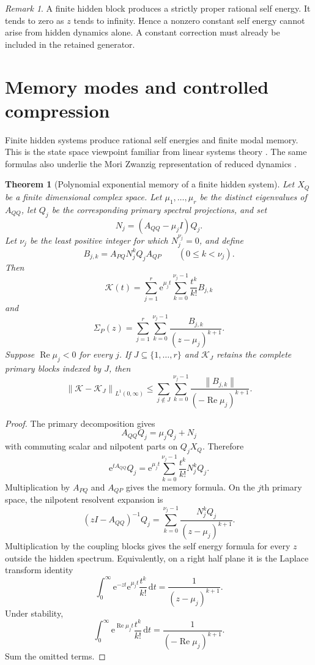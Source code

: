 \documentclass{aomart}
\newtheorem{theorem}{Theorem}[section]
\theoremstyle{definition}
\theoremstyle{remark}
\newtheorem{remark}[remark]{Remark}
\newcommand{\Kcal}{\mathcal K}
\newcommand{\e}{\mathrm e}
\newcommand{\dd}{\,\mathrm d}
\newcommand{\norm}[1]{\left\lVert#1\right\rVert}
\begin{document}
\begin{remark}
A finite hidden block produces a strictly proper rational self energy. It tends to zero as \(z\) tends to infinity. Hence a nonzero constant self energy cannot arise from hidden dynamics alone. A constant correction must already be included in the retained generator.
\end{remark}

\section{Memory modes and controlled compression}\label{sec:memory_compression}

Finite hidden systems produce rational self energies and finite modal memory. This is the state space viewpoint familiar from linear systems theory \cite{Kailath1980}. The same formulas also underlie the Mori Zwanzig representation of reduced dynamics \cite{Zwanzig1961,ChorinHaldKupferman2000}.

\begin{theorem}[Polynomial exponential memory of a finite hidden system]\label{thm:modal_memory}
Let \(X_Q\) be a finite dimensional complex space. Let \(\mu_1,\ldots,\mu_r\) be the distinct eigenvalues of \(A_{QQ}\), let \(Q_j\) be the corresponding primary spectral projections, and set
\[
N_j=(A_{QQ}-\mu_jI)Q_j.
\]
Let \(\nu_j\) be the least positive integer for which \(N_j^{\nu_j}=0\), and define
\[
B_{j,k}
=
A_{PQ}N_j^kQ_jA_{QP}
\qquad
(0\leq k<\nu_j).
\]
Then
\[
\Kcal(t)
=
\sum_{j=1}^r
\e^{\mu_jt}
\sum_{k=0}^{\nu_j-1}
\frac{t^k}{k!}B_{j,k}
\]
and
\[
\Sigma_P(z)
=
\sum_{j=1}^r
\sum_{k=0}^{\nu_j-1}
\frac{B_{j,k}}{(z-\mu_j)^{k+1}}.
\]
Suppose \(\operatorname{Re}\mu_j<0\) for every \(j\). If \(J\subseteq\{1,\ldots,r\}\) and \(\Kcal_J\) retains the complete primary blocks indexed by \(J\), then
\[
\norm{\Kcal-\Kcal_J}_{L^1(0,\infty)}
\leq
\sum_{j\notin J}
\sum_{k=0}^{\nu_j-1}
\frac{\norm{B_{j,k}}}
{(-\operatorname{Re}\mu_j)^{k+1}}.
\]
\end{theorem}

\begin{proof}
The primary decomposition gives
\[
A_{QQ}Q_j=\mu_jQ_j+N_j
\]
with commuting scalar and nilpotent parts on \(Q_jX_Q\). Therefore
\[
\e^{tA_{QQ}}Q_j
=
\e^{\mu_jt}
\sum_{k=0}^{\nu_j-1}
\frac{t^k}{k!}N_j^kQ_j.
\]
Multiplication by \(A_{PQ}\) and \(A_{QP}\) gives the memory formula. On the \(j\)th primary space, the nilpotent resolvent expansion is
\[
(zI-A_{QQ})^{-1}Q_j
=
\sum_{k=0}^{\nu_j-1}
\frac{N_j^kQ_j}{(z-\mu_j)^{k+1}}.
\]
Multiplication by the coupling blocks gives the self energy formula for every \(z\) outside the hidden spectrum. Equivalently, on a right half plane it is the Laplace transform identity
\[
\int_0^\infty
\e^{-zt}\e^{\mu_jt}
\frac{t^k}{k!}
\dd t
=
\frac{1}{(z-\mu_j)^{k+1}}.
\]
Under stability,
\[
\int_0^\infty
\e^{\operatorname{Re}\mu_jt}
\frac{t^k}{k!}
\dd t
=
\frac{1}{(-\operatorname{Re}\mu_j)^{k+1}}.
\]
Sum the omitted terms.
\end{proof}
\end{document}
